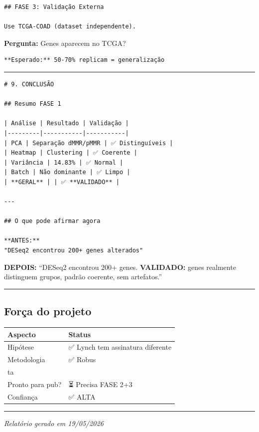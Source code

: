 \documentclass[
]{article}
\begin{document}
\begin{verbatim}
## FASE 3: Validação Externa

Use TCGA-COAD (dataset independente).
\end{verbatim}

\textbf{Pergunta:} Genes aparecem no TCGA?

\begin{verbatim}
**Esperado:** 50-70% replicam = generalização
\end{verbatim}

\begin{center}\rule{0.5\linewidth}{0.5pt}\end{center}

\begin{verbatim}
# 9. CONCLUSÃO

## Resumo FASE 1

| Análise | Resultado | Validação |
|---------|-----------|-----------|
| PCA | Separação dMMR/pMMR | ✅ Distinguíveis |
| Heatmap | Clustering | ✅ Coerente |
| Variância | 14.83% | ✅ Normal |
| Batch | Não dominante | ✅ Limpo |
| **GERAL** | | ✅ **VALIDADO** |

---

## O que pode afirmar agora

**ANTES:**
"DESeq2 encontrou 200+ genes alterados"
\end{verbatim}

\textbf{DEPOIS:} ``DESeq2 encontrou 200+ genes. \textbf{VALIDADO:} genes
realmente distinguem grupos, padrão coerente, sem artefatos.''

\begin{center}\rule{0.5\linewidth}{0.5pt}\end{center}

\subsection{Força do projeto}\label{foruxe7a-do-projeto}

\begin{longtable}[]{@{}ll@{}}
\toprule\noalign{}
Aspecto & Status \\
\midrule\noalign{}
\endhead
\bottomrule\noalign{}
\endlastfoot
Hipótese & ✅ Lynch tem assinatura diferente \\
Metodologia & ✅ Robus \\
ta & \\
Pronto para pub? & ⏳ Precisa FASE 2+3 \\
Confiança & ✅ ALTA \\
\end{longtable}

\begin{center}\rule{0.5\linewidth}{0.5pt}\end{center}

\emph{Relatório gerado em 19/05/2026}
\end{document}
